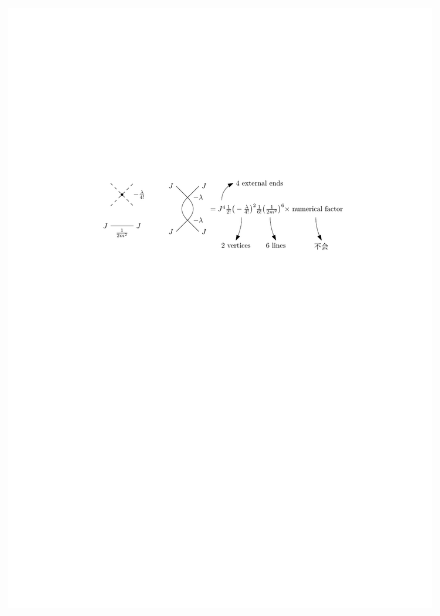 \begin{itemize}
	\begin{figure}[H]
		\centering
		\includegraphics[scale=1]{figures/a baby problem - Feynman diagram.pdf}
	\end{figure}
	

\end{itemize}
